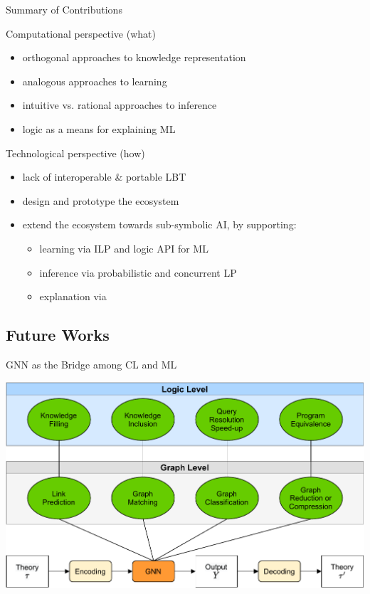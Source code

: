 \documentclass[presentation]{beamer}\mode<presentation>{\usetheme{AMSBolognaFC}}
\begin{document}
\begin{frame}{Summary of Contributions}
    \begin{block}{Computational perspective (what)}
        \begin{itemize}
            \item orthogonal approaches to knowledge representation
            \item analogous approaches to learning
            \item intuitive vs. rational approaches to inference
            \item logic as a means for explaining ML
        \end{itemize}
    \end{block}
    
    \begin{block}{Technological perspective (how)}
        \begin{itemize}
            \item lack of interoperable \& portable LBT 
            \item design and prototype the \twopkt{} ecosystem
            \item extend the ecosystem towards sub-symbolic AI, by supporting:
            \begin{itemize}
                \item \alert{learning} via ILP and logic API for ML
                \item \alert{inference} via probabilistic and concurrent LP
                \item \alert{explanation} via \psyke{} 
            \end{itemize}
        \end{itemize}
    \end{block}
\end{frame}

\subsection{Future Works}

\begin{frame}{GNN as the Bridge among CL and ML}
    \centering

    \includegraphics[width=\linewidth]{figures/workflow.pdf}
\end{frame}
\end{document}
